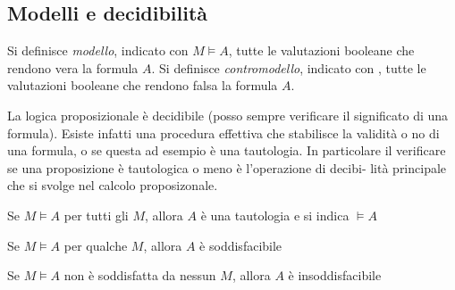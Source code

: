 \subsection{Modelli e decidibilità}
Si definisce \emph{modello}, indicato con $M \models A$, tutte le valutazioni booleane
che rendono vera la formula $A$.
Si definisce \emph{contromodello}, indicato con , tutte le valutazioni booleane
che rendono falsa la formula $A$.

La logica proposizionale è decidibile (posso sempre verificare il significato di una formula).
Esiste infatti una procedura effettiva che stabilisce la validità o no di una formula, o se questa
ad esempio è una tautologia.
In particolare il verificare se una proposizione è tautologica o meno è l’operazione di decibi-
lità principale che si svolge nel calcolo proposizonale.

\begin{defi}
    Se $M \models A$ per tutti gli $M$, allora $A$ è una tautologia e si indica $\models A$
\end{defi}

\begin{defi}
    Se $M \models A$ per qualche $M$, allora $A$ è soddisfacibile
\end{defi}

\begin{defi}
Se $M \models A$ non è soddisfatta da nessun $M$, allora $A$ è insoddisfacibile
\end{defi}
